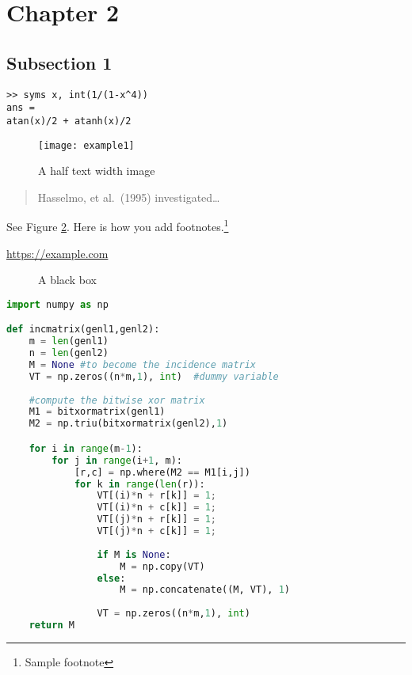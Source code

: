 \section{Chapter 2}

\subsection{Subsection 1}

\lipsum[10]

\begin{verbatim}
>> syms x, int(1/(1-x^4))
ans =
atan(x)/2 + atanh(x)/2
\end{verbatim}

\lipsum[20]

\begin{figure}[ht]
    \centering
    \texttt{[image: example1]}
    \caption{A half text width image}
    \label{fig:halfwidthimage}
\end{figure}

\begin{quote}
  Hasselmo, et al.\ (1995) investigated\dots
\end{quote}

See Figure \ref{fig:blackbox}. Here is how you add footnotes.\footnote{Sample footnote}

\lipsum[2]

\begin{center}
  \url{https://example.com}
\end{center}

\begin{figure}[ht]
  \centering
  \fbox{\rule[-0.5cm]{4cm}{4cm} \rule[-0.5cm]{4cm}{0cm}}
  \caption{A black box}
  \label{fig:blackbox}
\end{figure}

\lipsum[9]

\lipsum[2]

\begin{lstlisting}[language=Python]
import numpy as np

def incmatrix(genl1,genl2):
    m = len(genl1)
    n = len(genl2)
    M = None #to become the incidence matrix
    VT = np.zeros((n*m,1), int)  #dummy variable
    
    #compute the bitwise xor matrix
    M1 = bitxormatrix(genl1)
    M2 = np.triu(bitxormatrix(genl2),1) 

    for i in range(m-1):
        for j in range(i+1, m):
            [r,c] = np.where(M2 == M1[i,j])
            for k in range(len(r)):
                VT[(i)*n + r[k]] = 1;
                VT[(i)*n + c[k]] = 1;
                VT[(j)*n + r[k]] = 1;
                VT[(j)*n + c[k]] = 1;
                
                if M is None:
                    M = np.copy(VT)
                else:
                    M = np.concatenate((M, VT), 1)
                
                VT = np.zeros((n*m,1), int)
    return M
\end{lstlisting}
